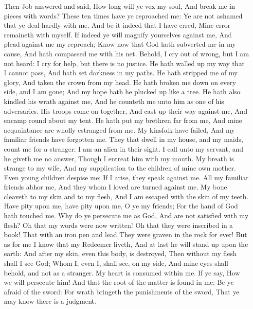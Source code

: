 Then Job answered and said,  How long will ye vex my soul, And break me in pieces with words?  These ten times have ye reproached me: Ye are not ashamed that ye deal hardly with me.  And be it indeed that I have erred, Mine error remaineth with myself.  If indeed ye will magnify yourselves against me, And plead against me my reproach;  Know now that God hath subverted me in my cause, And hath compassed me with his net.  Behold, I cry out of wrong, but I am not heard: I cry for help, but there is no justice.  He hath walled up my way that I cannot pass, And hath set darkness in my paths.  He hath stripped me of my glory, And taken the crown from my head.  He hath broken me down on every side, and I am gone; And my hope hath he plucked up like a tree.  He hath also kindled his wrath against me, And he counteth me unto him as one of his adversaries.  His troops come on together, And cast up their way against me, And encamp round about my tent.  He hath put my brethren far from me, And mine acquaintance are wholly estranged from me.  My kinsfolk have failed, And my familiar friends have forgotten me.  They that dwell in my house, and my maids, count me for a stranger: I am an alien in their sight.  I call unto my servant, and he giveth me no answer, Though I entreat him with my mouth.  My breath is strange to my wife, And my supplication to the children of mine own mother.  Even young children despise me; If I arise, they speak against me.  All my familiar friends abhor me, And they whom I loved are turned against me.  My bone cleaveth to my skin and to my flesh, And I am escaped with the skin of my teeth.  Have pity upon me, have pity upon me, O ye my friends; For the hand of God hath touched me.  Why do ye persecute me as God, And are not satisfied with my flesh?  Oh that my words were now written! Oh that they were inscribed in a book!  That with an iron pen and lead They were graven in the rock for ever!  But as for me I know that my Redeemer liveth, And at last he will stand up upon the earth:  And after my skin, even this body, is destroyed, Then without my flesh shall I see God;  Whom I, even I, shall see, on my side, And mine eyes shall behold, and not as a stranger. My heart is consumed within me.  If ye say, How we will persecute him! And that the root of the matter is found in me;  Be ye afraid of the sword: For wrath bringeth the punishments of the sword, That ye may know there is a judgment. 

